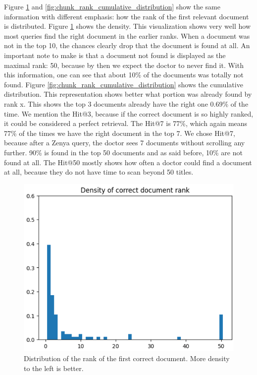 Figure \ref{fig:chunk_rank_density} and \ref{fig:chunk_rank_cumulative_distribution} show the same information with different emphasis: how the rank of the first relevant document is distributed. Figure \ref{fig:chunk_rank_density} shows the density. This visualization shows very well how most queries find the right document in the earlier ranks. When a document was not in the top 10, the chances clearly drop that the document is found at all. An important note to make is that a document not found is displayed as the maximal rank: 50, because by then we expect the doctor to never find it. With this information, one can see that about 10\% of the documents was totally not found. Figure \ref{fig:chunk_rank_cumulative_distribution} shows the cumulative distribution. This representation shows better what portion was already found by rank x. This shows the top 3 documents already have the right one 0.69\% of the time. We mention the Hit@3, because if the correct document is so highly ranked, it could be considered a perfect retrieval. The Hit@7 is 77\%, which again means 77\% of the times we have the right document in the top 7. We chose Hit@7, because after a Zenya query, the doctor sees 7 documents without scrolling any further. 90\% is found in the top 50 documents and as said before, 10\% are not found at all. The Hit@50 mostly shows how often a doctor could find a document at all, because they do not have time to scan beyond 50 titles.

\begin{figure}[H]
    \captionsetup{justification=centering}
    \centerline{\includegraphics[width=0.7\linewidth]{fig/rag_distribution.png}}
    \caption{Distribution of the rank of the first correct document. More density to the left is better.}
    \label{fig:chunk_rank_density}
\end{figure}

